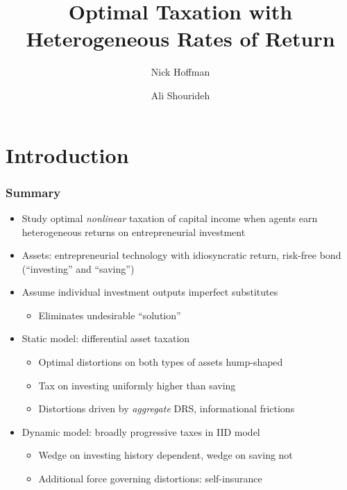 \documentclass{beamer}
\begin{document}
    
\title{Optimal Taxation with Heterogeneous Rates of Return}
\author[Hoffman, Shourideh]{Nick Hoffman \and Ali Shourideh }

\begin{frame}
\titlepage 
\end{frame}

\section{Introduction}
\begin{frame}
    \frametitle{Summary}

    \begin{itemize}
        \item Study optimal \textit{nonlinear} taxation of capital income when agents earn heterogeneous returns on entrepreneurial investment
        \item Assets: entrepreneurial technology with idiosyncratic return, risk-free bond (``investing'' and ``saving'')
        \item Assume individual investment outputs imperfect substitutes 
        \begin{itemize}
            \item Eliminates undesirable ``solution'' 
        \end{itemize}
        \item Static model: differential asset taxation 
        \begin{itemize}
            \item Optimal distortions on both types of assets hump-shaped 
            \item Tax on investing uniformly higher than saving 
            \item Distortions driven by \textit{aggregate} DRS, informational frictions 
        \end{itemize} 
        \item Dynamic model: broadly progressive taxes in IID model 
        \begin{itemize}
            \item Wedge on investing history dependent, wedge on saving not 
            \item Additional force governing distortions: self-insurance
        \end{itemize}
    \end{itemize}

\end{frame}
\end{document}
